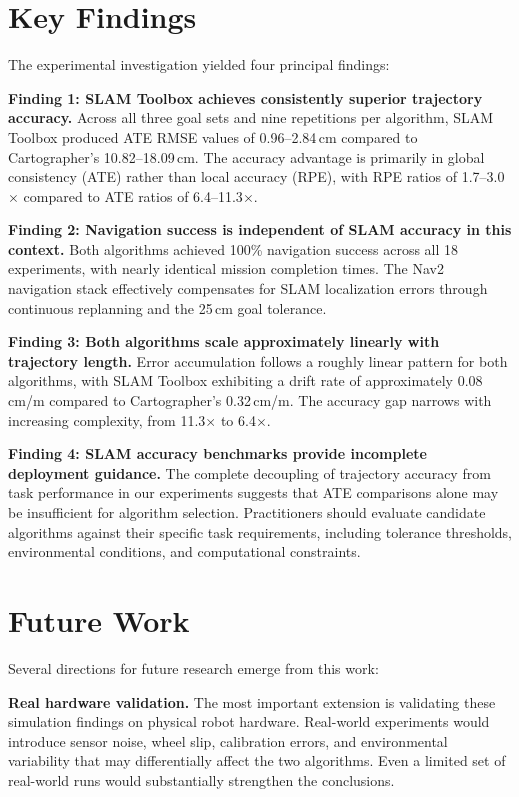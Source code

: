 \section{Key Findings}

The experimental investigation yielded four principal findings:

\textbf{Finding 1: SLAM Toolbox achieves consistently superior trajectory accuracy.} Across all three goal sets and nine repetitions per algorithm, SLAM Toolbox produced ATE RMSE values of 0.96--2.84\,cm compared to Cartographer's 10.82--18.09\,cm. The accuracy advantage is primarily in global consistency (ATE) rather than local accuracy (RPE), with RPE ratios of 1.7--3.0$\times$ compared to ATE ratios of 6.4--11.3$\times$.

\textbf{Finding 2: Navigation success is independent of SLAM accuracy in this context.} Both algorithms achieved 100\% navigation success across all 18 experiments, with nearly identical mission completion times. The Nav2 navigation stack effectively compensates for SLAM localization errors through continuous replanning and the 25\,cm goal tolerance.

\textbf{Finding 3: Both algorithms scale approximately linearly with trajectory length.} Error accumulation follows a roughly linear pattern for both algorithms, with SLAM Toolbox exhibiting a drift rate of approximately 0.08\,cm/m compared to Cartographer's 0.32\,cm/m. The accuracy gap narrows with increasing complexity, from 11.3$\times$ to 6.4$\times$.

\textbf{Finding 4: SLAM accuracy benchmarks provide incomplete deployment guidance.} The complete decoupling of trajectory accuracy from task performance in our experiments suggests that ATE comparisons alone may be insufficient for algorithm selection. Practitioners should evaluate candidate algorithms against their specific task requirements, including tolerance thresholds, environmental conditions, and computational constraints.

\section{Future Work}

Several directions for future research emerge from this work:

\textbf{Real hardware validation.} The most important extension is validating these simulation findings on physical robot hardware. Real-world experiments would introduce sensor noise, wheel slip, calibration errors, and environmental variability that may differentially affect the two algorithms. Even a limited set of real-world runs would substantially strengthen the conclusions.

